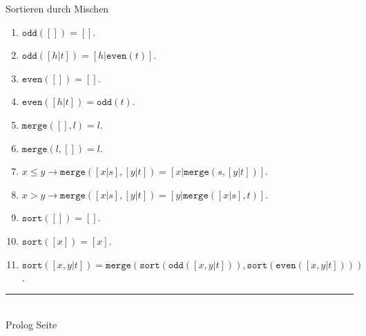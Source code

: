 \documentclass{slides}
\newcommand{\myrule}{\rule{20cm}{1mm}\\ }
\newcounter{mypage}
\begin{document}


\begin{slide}{}
\normalsize
\begin{center}
Sortieren durch Mischen
\end{center}
\vspace{0.5cm}

\footnotesize
\begin{enumerate}
\item $\mathtt{odd}([]) = []$.
\item $\mathtt{odd}([h|t]) = [h|\mathtt{even}(t)]$.
\item $\mathtt{even}([]) = []$.
\item $\mathtt{even}([h|t]) = \mathtt{odd}(t)$.
\item $\mathtt{merge}([], l) = l$.
\item $\mathtt{merge}(l, []) = l$.
\item $x \leq y \rightarrow \mathtt{merge}([x|s], [y|t]) = [x|\mathtt{merge}(s, [y|t])]$.
\item $x  >   y \rightarrow \mathtt{merge}([x|s], [y|t]) = [y|\mathtt{merge}([x|s], t)]$.
\item $\mathtt{sort}([]) = []$.
\item $\mathtt{sort}([x]) = [x]$.
\item $\mathtt{sort}([x,y|t]) = \mathtt{merge}( \mathtt{sort}(\mathtt{odd}([x,y|t])), \mathtt{sort}(\mathtt{even}([x,y|t])))$.
\end{enumerate}

\vspace*{\fill}
\tiny \addtocounter{mypage}{1}
\myrule
Prolog  \hspace*{\fill} Seite 
\end{slide}
\end{document}
